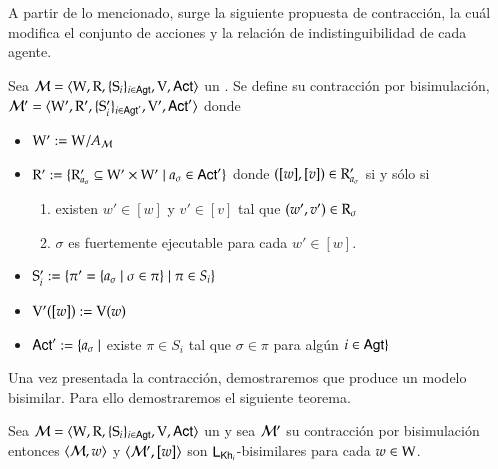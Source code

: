 A partir de lo mencionado, surge la siguiente propuesta de contracción, la cuál modifica el conjunto de acciones y la relación de indistinguibilidad 
de cada agente.


\begin{definicion}
    Sea $\model=\tup{\W,\R,\cset{\S_i}_{i \in \AGT},\V,\ACT}$ un \ults. Se define su contracción por bisimulación, $\model'=\tup{\W',\R',\cset{\S_i'}_{i \in \AGT'},\V',\ACT'}$ donde 
    \begin{center}
        \begin{itemize}
            \item $\W' := \W/A_\modults$
            \item $\R' := \{\R'_{a_\sigma} \subseteq \W' \times \W' \mid a_\sigma \in \ACT'\}$ donde $([w],[v]) \in \R'_{a_\sigma}$ si y sólo si
            \begin{enumerate}
                \item existen $w' \in [w]$ y $v' \in [v]$ tal que $(w',v')\in \R_\sigma$
                \item $\sigma$ es fuertemente ejecutable para cada $w' \in [w]$.
            \end{enumerate}
            \item $\S_i' := \{ \pi' = \{a_\sigma \mid \sigma \in \pi\} \mid \pi \in S_i \}$
            \item $\V'([w]) := \V(w)$
            \item $\ACT' := \{a_\sigma \mid $ existe $ \pi\in S_i$ tal que $ \sigma \in \pi$ para algún $i \in \AGT \}$ 
        \end{itemize}
    \end{center}
\end{definicion}
    
Una vez presentada la contracción, demostraremos que produce un modelo bisimilar. Para ello demostraremos el siguiente teorema.

\begin{teorema}
    Sea $\model=\tup{\W,\R,\cset{\S_i}_{i \in \AGT},\V,\ACT}$ un \ults y sea $\modults'$ su contracción por bisimulación entonces 
    $\tup{\modults,w}$ y $\tup{\modults',[w]}$ son $\KHilogic$-bisimilares para cada $w \in \W$.
\end{teorema}

